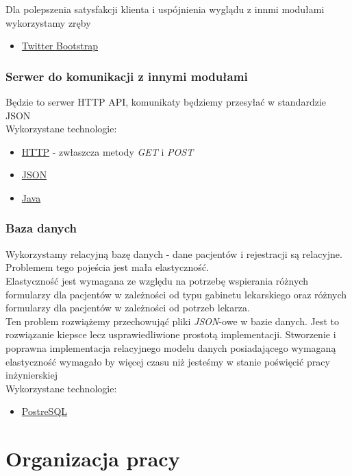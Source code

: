 \documentclass[polish,12pt]{aghthesis}
\begin{document}
Dla polepszenia satysfakcji klienta i uspójnienia wyglądu z innmi modułami wykorzystamy zręby
\begin{itemize}
  \item \href{https://getbootstrap.com/}{Twitter Bootstrap}
\end{itemize}

\subsubsection{Serwer do komunikacji z innymi modułami}
Będzie to serwer HTTP API, komunikaty będziemy przesyłać w standardzie JSON \\
Wykorzystane technologie:
\begin{itemize}
  \item \href{https://pl.wikipedia.org/wiki/Hypertext_Transfer_Protocol}{HTTP} - zwłaszcza metody \emph{GET} i \emph{POST}
  \item \href{http://www.json.org/}{JSON}
  \item \href{https://www.oracle.com/java/index.html}{Java}
\end{itemize}

\subsubsection{Baza danych}
\label{subsec:wykorzystane-technologie-baza}
Wykorzystamy relacyjną bazę danych - dane pacjentów i rejestracji są relacyjne. Problemem tego pojeścia jest mała elastyczność. \\
Elastyczność jest wymagana ze względu na potrzebę wspierania różnych formularzy dla pacjentów w zależności od typu gabinetu lekarskiego oraz różnych formularzy dla pacjentów w zależności od potrzeb lekarza. \\
Ten problem rozwiążemy przechowująć pliki \emph{JSON}-owe w bazie danych. Jest to rozwiązanie kiepsce lecz usprawiedliwione prostotą implementacji. Stworzenie i poprawna implementacja relacyjnego modelu danych posiadającego wymaganą elastyczność wymagało by więcej czasu niż jesteśmy w stanie poświęcić pracy inżynierskiej \\
Wykorzystane technologie:
\begin{itemize}
  \item \href{https://www.postgresql.org/}{PostreSQL}
\end{itemize}


\section{Organizacja pracy}
\label{sec:organizacja-pracy}
\end{document}
